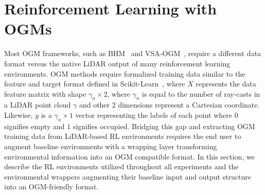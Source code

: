\section{Reinforcement Learning with OGMs}
\label{sec:methods}



\noindent
Most OGM frameworks, such as BHM~\cite{senanayake2017bayesian} and VSA-OGM~\cite{snyder2024brain}, require a different data format versus the native LiDAR output of many reinforcement learning environments. OGM methods require formalized training data similar to the feature and target format defined in Scikit-Learn~\cite{pedregosa2011scikit}, where $X$ represents the data feature matrix with shape $\gamma_n \times 2$, where $\gamma_n$ is equal to the number of ray-casts in a LiDAR point cloud $\gamma$ and other 2 dimensions represent a Cartesian coordinate. Likewise, $y$ is a $\gamma_n\times1$ vector representing the labels of each point where $0$ signifies empty and $1$ signifies occupied.
Bridging this gap and extracting OGM training data from LiDAR-based RL environments requires the end user to augment baseline environments with a wrapping layer transforming environmental information into an OGM compatible format. In this section, we describe the RL environments utilized throughout all experiments and the environmental wrappers augmenting their baseline input and output structure into an OGM-friendly format.

